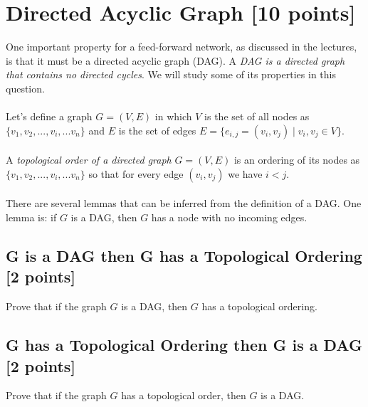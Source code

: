 %

\renewcommand\thesection{\arabic{section}}
\renewcommand\thesubsection{\thesection.\arabic{subsection}}

\section{Directed Acyclic Graph [10 points]}
One important property for a feed-forward network, as discussed in the lectures, is that it must be a directed acyclic graph (DAG). A \textit{DAG is a directed graph that contains no directed cycles}. We will study some of its properties in this question.
\\\\
Let's define a graph $G=(V, E)$ in which $V$ is the set of all nodes as $\{v_1, v_2, ..., v_i, ... v_n\}$ and $E$ is the set of 
edges $E = \big\{e_{i,j} = (v_i, v_j) \mid v_i, v_j \in V \big\}$.
\\\\
A \textit{topological order of a directed graph} $G=(V, E)$ is an ordering of its nodes as $\{v_1, v_2, ..., v_i, ... v_n\}$ so that for every edge $(v_i, v_j)$ we have $i < j$.
\\\\
There are several lemmas that can be inferred from the definition of a DAG. One lemma is: if $G$ is a DAG, then $G$ has a node with no incoming edges.

\medskip

\subsection{G is a DAG then G has a Topological Ordering [2 points]}
Prove that if the graph $G$ is a DAG, then $G$ has a topological ordering.


\taskbreak

\subsection{G has a Topological Ordering then G is a DAG [2 points]}
Prove that if the graph $G$ has a topological order, then $G$ is a DAG.

